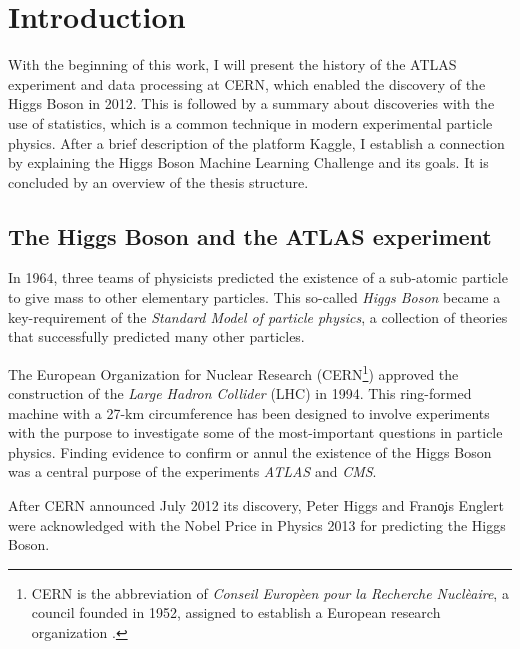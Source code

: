 \section{Introduction}\label{ch:intro}\raggedbottom
With the beginning of this work, I will present the history of the ATLAS experiment and data processing at CERN, which enabled the discovery of the Higgs Boson in 2012. This is followed by a summary about discoveries with the use of statistics, which is a common technique in modern experimental particle physics.
After a brief description of the platform Kaggle, I establish a connection by explaining the Higgs Boson Machine Learning Challenge and its goals. It is concluded by an overview of the thesis structure.

\subsection{The Higgs Boson and the ATLAS experiment}
In 1964, three teams of physicists predicted the existence of a sub-atomic particle to give mass to other elementary particles. This so-called \emph{Higgs Boson} became a key-requirement of the \emph{Standard Model of particle physics}, a collection of theories that successfully predicted many other particles.

The European Organization for Nuclear Research (CERN\footnote{CERN is the abbreviation of \emph{Conseil Europ\`een pour la Recherche Nucl\`eaire}, a council founded in 1952, assigned to establish a European research organization \cite{cernHP}.}) approved the construction of the \emph{Large Hadron Collider} (LHC) in 1994. This ring-formed machine with a  27-km circumference has been designed to involve experiments with the purpose to investigate some of the most-important questions in particle physics. Finding evidence to confirm or annul the existence of the Higgs Boson was a central purpose of the experiments \emph{ATLAS} and \emph{CMS}.

After CERN announced July 2012 its discovery, Peter Higgs and Fran\c ois Englert were acknowledged with the Nobel Price in Physics 2013 for predicting the Higgs Boson.

